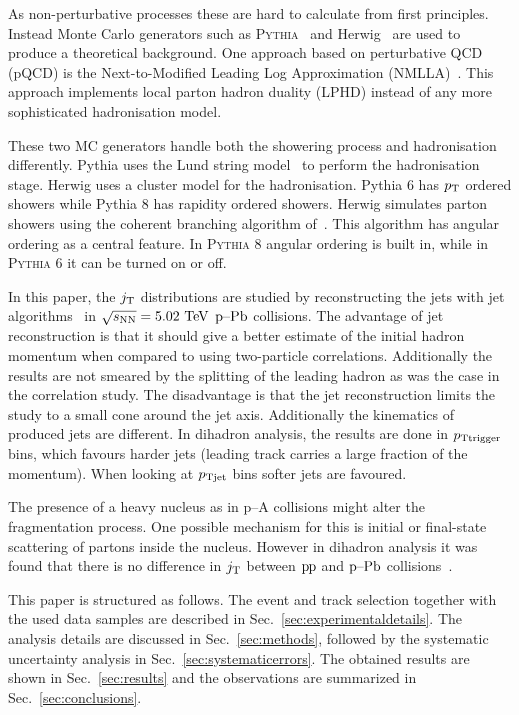 As non-perturbative processes these are hard to calculate from first principles. Instead Monte Carlo generators such as \textsc{Pythia}~\cite{introPythia81} and Herwig~\cite{Herwig7releaseNote} are used to produce a theoretical background. One approach based on perturbative QCD (pQCD) is the Next-to-Modified Leading Log Approximation (NMLLA)~\cite{nmlla}. This approach implements local parton hadron duality (LPHD) instead of any more sophisticated hadronisation model.

These two MC generators handle both the showering process and hadronisation differently. Pythia uses the Lund string model~\cite{lundString} to perform the hadronisation stage. Herwig uses a cluster model for the hadronisation. Pythia 6 has $p_{\rm T}$ ordered showers while Pythia 8 has rapidity ordered showers. Herwig simulates parton showers using the coherent branching algorithm of~\cite{Gieseke:2003rz}. This algorithm has angular ordering as a central feature. In \textsc{Pythia} 8 angular ordering is built in, while in \textsc{Pythia} 6 it can be turned on or off.

In this paper, the $j_{\rm T}$ distributions are studied by reconstructing the jets with jet algorithms~\cite{antikt} in $\sqrt{s_{\mathrm{NN}}} = 5.02~\mathrm{TeV}$ $\mbox{p--Pb}$ collisions. The advantage of jet reconstruction is that it should give a better estimate of the initial hadron momentum when compared to using two-particle correlations. Additionally the results are not smeared by the splitting of the leading hadron as was the case in the correlation study. The disadvantage is that the jet reconstruction limits the study to a small cone around the jet axis. Additionally the kinematics of produced jets are different. In dihadron analysis, the results are done in $p_{\rm Ttrigger}$ bins, which favours harder jets (leading track carries a large fraction of the momentum). When looking at $p_{\rm Tjet}$ bins softer jets are favoured.

The presence of a heavy nucleus as in p--A collisions might alter the fragmentation process. One possible mechanism for this is initial or final-state scattering of partons inside the nucleus. However in dihadron analysis it was found that there is no difference in $j_{\rm T}$ between $\mbox{p\kern-0.05em p}$ and $\mbox{p--Pb}$ collisions~\cite{ALICEjt}.

This paper is structured as follows. The event and track selection together with the used data samples are described in Sec.~\ref{sec:experimentaldetails}. The analysis details are discussed in Sec.~\ref{sec:methods}, followed by the systematic uncertainty analysis in Sec.~\ref{sec:systematicerrors}. The obtained results are shown in Sec.~\ref{sec:results} and the observations are summarized in Sec.~\ref{sec:conclusions}.


